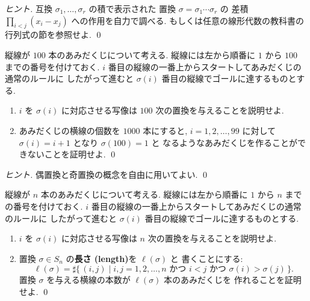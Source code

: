 \documentclass[12pt,twoside]{jarticle}
\begin{document}
\begin{proof}[ヒント]
 互換 $\sigma_1,\ldots,\sigma_r$ の積で表示された
 置換 $\sigma = \sigma_1\cdots\sigma_r$ の
 差積 $\prod_{i<j}(x_i-x_j)$ への作用を自力で調べる. 
 もしくは任意の線形代数の教科書の行列式の節を参照せよ.
 \qed
\end{proof}


\begin{question}[15点]
  縦線が $100$ 本のあみだくじについて考える.
  縦線には左から順番に $1$ から $100$ までの番号を付けておく.
  $i$ 番目の縦線の一番上からスタートしてあみだくじの通常のルールに
  したがって進むと $\sigma(i)$ 番目の縦線でゴールに達するものとする.
  \begin{enumerate}
  \item 
    $i$ を $\sigma(i)$ に対応させる写像は $100$ 次の置換を与えることを説明せよ.
  \item
    あみだくじの横線の個数を $1000$ 本にすると, %
    $i=1,2,\ldots,99$ に対して $\sigma(i)=i+1$ となり $\sigma(100)=1$ と
    なるようなあみだくじを作ることができないことを証明せよ.
  \qed
  \end{enumerate}
\end{question}

\begin{proof}[ヒント]
  偶置換と奇置換の概念を自由に用いてよい.
  \qed
\end{proof}


\begin{question}[20点]
  縦線が $n$ 本のあみだくじについて考える.
  縦線には左から順番に $1$ から $n$ までの番号を付けておく.
  $i$ 番目の縦線の一番上からスタートしてあみだくじの通常のルールに
  したがって進むと $\sigma(i)$ 番目の縦線でゴールに達するものとする.
  \begin{enumerate}
  \item 
    $i$ を $\sigma(i)$ に対応させる写像は $n$ 次の置換を与えることを説明せよ.
  \item
    置換 $\sigma\in S_n$ の{\bf 長さ (length)}を $\ell(\sigma)$ と
    書くことにする:
    \begin{equation*}
      \ell(\sigma) 
      = \sharp
        \{\, (i,j) \mid 
        \text{$i,j=1,2,\ldots,n$ かつ $i<j$ かつ $\sigma(i)>\sigma(j)$}
        \,\}.
    \end{equation*}
    置換 $\sigma$ を与える横線の本数が $\ell(\sigma)$ 本のあみだくじを
    作れることを証明せよ.
    \qed
  \end{enumerate}
\end{question}  
\end{document}
